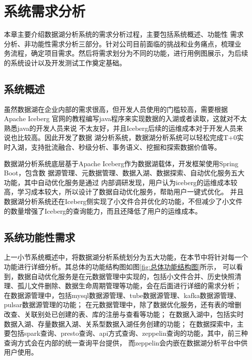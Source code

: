 
\chapter{系统需求分析}

本章主要介绍数据湖分析系统的需求分析过程，主要包括系统概述、功能性
需求分析、非功能性需求分析三部分。针对公司目前面临的挑战和业务痛点，梳理业
务流程，确定项目需求。然后将需求划分为不同的功能，进行用例图展示，为后续的系统设计以及开发测试工作奠定基础。

\section{系统概述}

虽然数据湖在企业内部的需求很高，但开发人员使用的门槛较高，需要根据Apache Iceberg
官网的教程编写java程序来实现数据的入湖或者读取，这就对不太熟悉java的开发人员来说
不太友好，并且Iceberg后续的运维成本对于开发人员来说也比较高。因此开发了数据
湖分析系统，数据湖分析系统可以轻松完成T+0实时入湖，支持批流融合、秒级分析、事务语义、挖掘和探索数据价值等。

数据湖分析系统底层基于Apache Iceberg作为数据湖载体，开发框架使用Spring Boot，包含数
据源管理、元数据管理、数据入湖、数据探索、自动优化服务五大功能，其中自动优化服务是通过
内部调研发现，用户认为iceberg的运维成本较高，学习成本较大，所以设计了数据自动优化服务，帮助用户一键式优化。
并且数据湖分析系统还在Iceberg侧实现了小文件合并优化的功能，不但减少了小文件的数量增强了Iceberg的查询能力，而且还降低了用户的运维成本。

\section{系统功能性需求}

上一小节系统概述中，将数据湖分析系统划分为五大功能，在本节中将针对每一个功能进行详细分析。其总体的功能结构图如图\ref{fig:总体功能结构图}所示，
可以看到，数据自动优化服务是在元数据管理中实现的，包括小文件合并、历史快照清理、孤儿文件删除、数据生命周期管理等功能，会在后面进行详细的需求分析；
在数据源管理中，包括mysql数据源管理、tube数据源管理、kafka数据源管理、pulsar数据源管理的功能；
在元数据管理中，除了数据优化服务，还有表的增删改查、关联别处已创建的表、库的注册与查看等功能；
在数据入湖中，包括实时数据入湖、存量数据入湖、关系型数据入湖任务创建的功能；
在数据探索中，主要包括spark查询、presto查询、api方式查询、zeppelin查询的功能，其中，前三种查询方式会在内部的统一查询平台提供，
而zeppelin会内嵌在数据湖分析平台中供用户使用。

